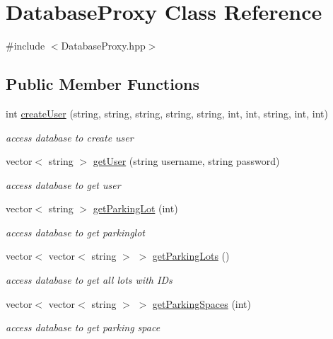 \hypertarget{class_database_proxy}{}\section{Database\+Proxy Class Reference}
\label{class_database_proxy}


{\ttfamily \#include $<$Database\+Proxy.\+hpp$>$}

\subsection*{Public Member Functions}
\begin{DoxyCompactItemize}
\item 
int \mbox{\hyperlink{class_database_proxy_abe0e5778383920086854c194b3802f61}{create\+User}} (string, string, string, string, string, int, int, string, int, int)
\begin{DoxyCompactList}\small\item\em access database to create user \end{DoxyCompactList}\item 
vector$<$ string $>$ \mbox{\hyperlink{class_database_proxy_a66ecbbd816b9528c9c537ef29a9c976e}{get\+User}} (string username, string password)
\begin{DoxyCompactList}\small\item\em access database to get user \end{DoxyCompactList}\item 
vector$<$ string $>$ \mbox{\hyperlink{class_database_proxy_a5258d465ec8d2a9e47457644fb6fc27a}{get\+Parking\+Lot}} (int)
\begin{DoxyCompactList}\small\item\em access database to get parkinglot \end{DoxyCompactList}\item 
vector$<$ vector$<$ string $>$ $>$ \mbox{\hyperlink{class_database_proxy_a81b6e2c6ac50dfbc271a837881fdd869}{get\+Parking\+Lots}} ()
\begin{DoxyCompactList}\small\item\em access database to get all lots with I\+Ds \end{DoxyCompactList}\item 
vector$<$ vector$<$ string $>$ $>$ \mbox{\hyperlink{class_database_proxy_a89c65c6817719c84dff2a2f480b0b9cc}{get\+Parking\+Spaces}} (int)
\begin{DoxyCompactList}\small\item\em access database to get parking space \end{DoxyCompactList}\item 

\end{DoxyCompactItemize}

